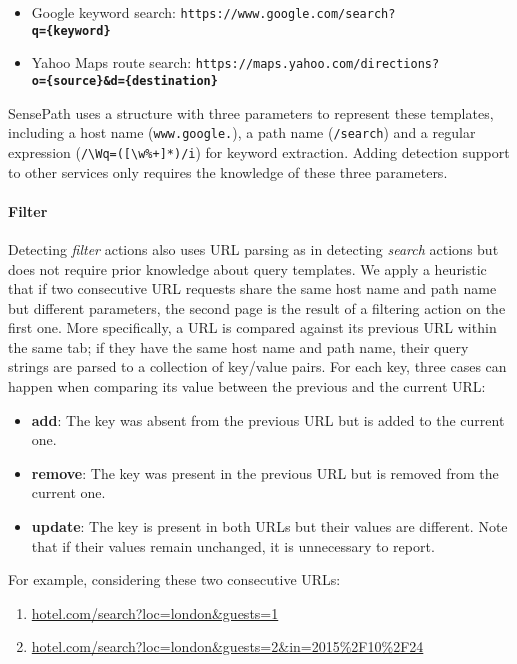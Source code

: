 \begin{itemize}
	\item Google keyword search: \texttt{https://www.google.com/search?\\\textbf{q=\{keyword\}}}
	\item Yahoo Maps route search: \texttt{https://maps.yahoo.com/directions?\\\textbf{o=\{source\}\&d=\{destination\}}}
\end{itemize}

SensePath uses a structure with three parameters to represent these templates, including a host name (\texttt{www.google.}), a path name (\texttt{/search}) and a regular expression (\verb|/\Wq=([\w%+]*)/i|) for keyword extraction. Adding detection support to other services only requires the knowledge of these three parameters.

\paragraph{Filter}
Detecting \emph{filter} actions also uses URL parsing as in detecting \emph{search} actions but does not require prior knowledge about query templates. We apply a heuristic that if two consecutive URL requests share the same host name and path name but different parameters, the second page is the result of a filtering action on the first one. More specifically, a URL is compared against its previous URL within the same tab; if they have the same host name and path name, their query strings are parsed to a collection of key/value pairs. For each key, three cases can happen when comparing its value between the previous and the current URL:

\begin{itemize}
	\item \textbf{add}: The key was absent from the previous URL but is added to the current one.
	\item \textbf{remove}: The key was present in the previous URL but is removed from the current one.
	\item \textbf{update}: The key is present in both URLs but their values are different. Note that if their values remain unchanged, it is unnecessary to report.
\end{itemize}

For example, considering these two consecutive URLs:
\begin{enumerate}
	\item \url{hotel.com/search?loc=london&guests=1}
	\item \url{hotel.com/search?loc=london&guests=2&in=2015%2F10%2F24}
\end{enumerate}

